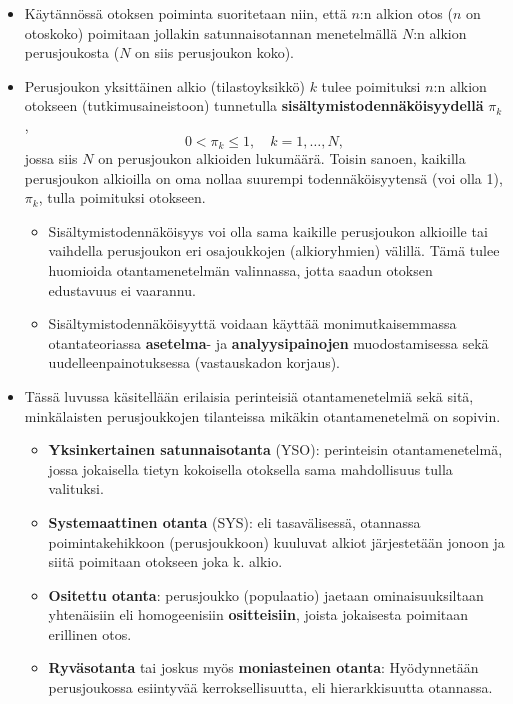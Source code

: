 \documentclass[
]{book}
\providecommand{\tightlist}{%
  \setlength{\itemsep}{0pt}\setlength{\parskip}{0pt}}
\begin{document}
\begin{itemize}
\tightlist
\item
  Käytännössä otoksen poiminta suoritetaan niin, että \(n\):n alkion otos (\(n\) on otoskoko) poimitaan jollakin satunnaisotannan menetelmällä \(N\):n alkion perusjoukosta (\(N\) on siis perusjoukon koko).
\item
  Perusjoukon yksittäinen alkio (tilastoyksikkö) \(k\) tulee poimituksi \(n\):n alkion otokseen (tutkimusaineistoon) tunnetulla \textbf{sisältymistodennäköisyydellä} \(\pi_k\),
  \[
  0 < \pi_k \le 1, \quad k = 1, \ldots, N,
  \]
  jossa siis \(N\) on perusjoukon alkioiden lukumäärä. Toisin sanoen, kaikilla perusjoukon alkioilla on oma nollaa suurempi todennäköisyytensä (voi olla 1), \(\pi_k\), tulla poimituksi otokseen.

  \begin{itemize}
  \tightlist
  \item
    Sisältymistodennäköisyys voi olla sama kaikille perusjoukon alkioille tai vaihdella perusjoukon eri osajoukkojen (alkioryhmien) välillä. Tämä tulee huomioida otantamenetelmän valinnassa, jotta saadun otoksen edustavuus ei vaarannu.
  \item
    Sisältymistodennäköisyyttä voidaan käyttää monimutkaisemmassa otantateoriassa \textbf{asetelma}- ja \textbf{analyysipainojen} muodostamisessa sekä uudelleenpainotuksessa (vastauskadon korjaus).
  \end{itemize}
\item
  Tässä luvussa käsitellään erilaisia perinteisiä otantamenetelmiä sekä sitä, minkälaisten perusjoukkojen tilanteissa mikäkin otantamenetelmä on sopivin.

  \begin{itemize}
  \tightlist
  \item
    \textbf{Yksinkertainen satunnaisotanta} (YSO): perinteisin otantamenetelmä, jossa jokaisella tietyn kokoisella otoksella sama mahdollisuus tulla valituksi.
  \item
    \textbf{Systemaattinen otanta} (SYS): eli tasavälisessä, otannassa poimintakehikkoon (perusjoukkoon) kuuluvat alkiot järjestetään jonoon ja siitä poimitaan otokseen joka k. alkio.
  \item
    \textbf{Ositettu otanta}: perusjoukko (populaatio) jaetaan ominaisuuksiltaan yhtenäisiin eli homogeenisiin \textbf{ositteisiin}, joista jokaisesta poimitaan erillinen otos.
  \item
    \textbf{Ryväsotanta} tai joskus myös \textbf{moniasteinen otanta}: Hyödynnetään perusjoukossa esiintyvää kerroksellisuutta, eli hierarkkisuutta otannassa.
  \end{itemize}
\end{itemize}
\end{document}
